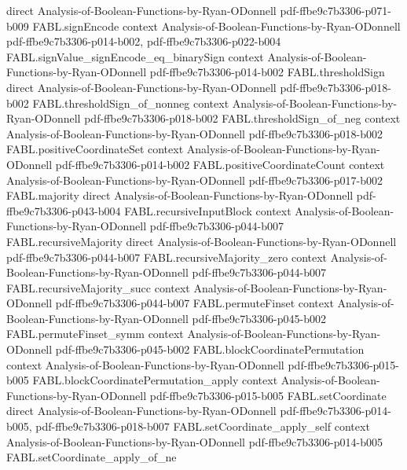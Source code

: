 \begin{theorem}
  {direct}
  {Analysis-of-Boolean-Functions-by-Ryan-ODonnell}
  {pdf-ffbe9c7b3306-p071-b009}
\proofstep
  {FABL.signEncode}
  {context}
  {Analysis-of-Boolean-Functions-by-Ryan-ODonnell}
  {pdf-ffbe9c7b3306-p014-b002,
    pdf-ffbe9c7b3306-p022-b004}
\proofstep
  {FABL.signValue_signEncode_eq_binarySign}
  {context}
  {Analysis-of-Boolean-Functions-by-Ryan-ODonnell}
  {pdf-ffbe9c7b3306-p014-b002}
\proofstep
  {FABL.thresholdSign}
  {direct}
  {Analysis-of-Boolean-Functions-by-Ryan-ODonnell}
  {pdf-ffbe9c7b3306-p018-b002}
\proofstep
  {FABL.thresholdSign_of_nonneg}
  {context}
  {Analysis-of-Boolean-Functions-by-Ryan-ODonnell}
  {pdf-ffbe9c7b3306-p018-b002}
\proofstep
  {FABL.thresholdSign_of_neg}
  {context}
  {Analysis-of-Boolean-Functions-by-Ryan-ODonnell}
  {pdf-ffbe9c7b3306-p018-b002}
\proofstep
  {FABL.positiveCoordinateSet}
  {context}
  {Analysis-of-Boolean-Functions-by-Ryan-ODonnell}
  {pdf-ffbe9c7b3306-p014-b002}
\proofstep
  {FABL.positiveCoordinateCount}
  {context}
  {Analysis-of-Boolean-Functions-by-Ryan-ODonnell}
  {pdf-ffbe9c7b3306-p017-b002}
\proofstep
  {FABL.majority}
  {direct}
  {Analysis-of-Boolean-Functions-by-Ryan-ODonnell}
  {pdf-ffbe9c7b3306-p043-b004}
\proofstep
  {FABL.recursiveInputBlock}
  {context}
  {Analysis-of-Boolean-Functions-by-Ryan-ODonnell}
  {pdf-ffbe9c7b3306-p044-b007}
\proofstep
  {FABL.recursiveMajority}
  {direct}
  {Analysis-of-Boolean-Functions-by-Ryan-ODonnell}
  {pdf-ffbe9c7b3306-p044-b007}
\proofstep
  {FABL.recursiveMajority_zero}
  {context}
  {Analysis-of-Boolean-Functions-by-Ryan-ODonnell}
  {pdf-ffbe9c7b3306-p044-b007}
\proofstep
  {FABL.recursiveMajority_succ}
  {context}
  {Analysis-of-Boolean-Functions-by-Ryan-ODonnell}
  {pdf-ffbe9c7b3306-p044-b007}
\proofstep
  {FABL.permuteFinset}
  {context}
  {Analysis-of-Boolean-Functions-by-Ryan-ODonnell}
  {pdf-ffbe9c7b3306-p045-b002}
\proofstep
  {FABL.permuteFinset_symm}
  {context}
  {Analysis-of-Boolean-Functions-by-Ryan-ODonnell}
  {pdf-ffbe9c7b3306-p045-b002}
\proofstep
  {FABL.blockCoordinatePermutation}
  {context}
  {Analysis-of-Boolean-Functions-by-Ryan-ODonnell}
  {pdf-ffbe9c7b3306-p015-b005}
\proofstep
  {FABL.blockCoordinatePermutation_apply}
  {context}
  {Analysis-of-Boolean-Functions-by-Ryan-ODonnell}
  {pdf-ffbe9c7b3306-p015-b005}
\proofstep
  {FABL.setCoordinate}
  {direct}
  {Analysis-of-Boolean-Functions-by-Ryan-ODonnell}
  {pdf-ffbe9c7b3306-p014-b005,
    pdf-ffbe9c7b3306-p018-b007}
\proofstep
  {FABL.setCoordinate_apply_self}
  {context}
  {Analysis-of-Boolean-Functions-by-Ryan-ODonnell}
  {pdf-ffbe9c7b3306-p014-b005}
\proofstep
  {FABL.setCoordinate_apply_of_ne}

\end{theorem}
